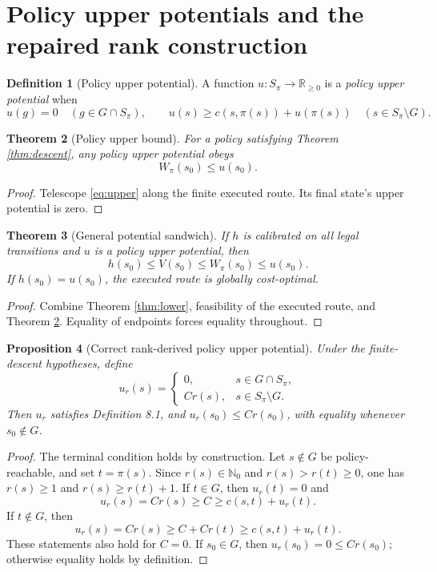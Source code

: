 \documentclass[11pt,letterpaper]{article}
\newtheorem{theorem}{Theorem}[section]
\newtheorem{proposition}[theorem]{Proposition}
\theoremstyle{definition}\newtheorem{definition}[theorem]{Definition}\newtheorem{example}[theorem]{Example}
\theoremstyle{remark}\newtheorem{remark}[theorem]{Remark}
\newcommand{\NN}{\mathbb N_0}
\newcommand{\RR}{\mathbb R}
\begin{document}
\section{Policy upper potentials and the repaired rank construction}
\begin{definition}[Policy upper potential]
A function $u:S_\pi\to\RR_{\ge0}$ is a \emph{policy upper potential} when
\begin{equation}\label{eq:upper}
 u(g)=0\quad(g\in G\cap S_\pi),\qquad
 u(s)\ge c(s,\pi(s))+u(\pi(s))\quad(s\in S_\pi\setminus G).
\end{equation}
\end{definition}
\begin{theorem}[Policy upper bound]\label{thm:upper}
For a policy satisfying Theorem \ref{thm:descent}, any policy upper potential obeys
\[
 W_\pi(s_0)\le u(s_0).
\]
\end{theorem}
\begin{proof}
Telescope \eqref{eq:upper} along the finite executed route. Its final state's upper potential is zero.
\end{proof}
\begin{theorem}[General potential sandwich]\label{thm:sandwich}
If $h$ is calibrated on all legal transitions and $u$ is a policy upper potential, then
\begin{equation}\label{eq:sandwich}
\boxed{h(s_0)\le V(s_0)\le W_\pi(s_0)\le u(s_0).}
\end{equation}
If $h(s_0)=u(s_0)$, the executed route is globally cost-optimal.
\end{theorem}
\begin{proof}
Combine Theorem \ref{thm:lower}, feasibility of the executed route, and Theorem \ref{thm:upper}. Equality of endpoints forces equality throughout.
\end{proof}
\begin{proposition}[Correct rank-derived policy upper potential]\label{prop:rankupper}
Under the finite-descent hypotheses, define
\begin{equation}\label{eq:corrected}
\boxed{u_r(s)=\begin{cases}
0,&s\in G\cap S_\pi,\\
Cr(s),&s\in S_\pi\setminus G.
\end{cases}}
\end{equation}
Then $u_r$ satisfies Definition 8.1, and $u_r(s_0)\le Cr(s_0)$, with equality whenever $s_0\notin G$.
\end{proposition}
\begin{proof}
The terminal condition holds by construction. Let $s\notin G$ be policy-reachable, and set $t=\pi(s)$. Since $r(s)\in\NN$ and $r(s)>r(t)\ge0$, one has $r(s)\ge1$ and $r(s)\ge r(t)+1$.
If $t\in G$, then $u_r(t)=0$ and
\[
 u_r(s)=Cr(s)\ge C\ge c(s,t)+u_r(t).
\]
If $t\notin G$, then
\[
 u_r(s)=Cr(s)\ge C+Cr(t)\ge c(s,t)+u_r(t).
\]
These statements also hold for $C=0$. If $s_0\in G$, then $u_r(s_0)=0\le Cr(s_0)$; otherwise equality holds by definition.
\end{proof}
\end{document}
